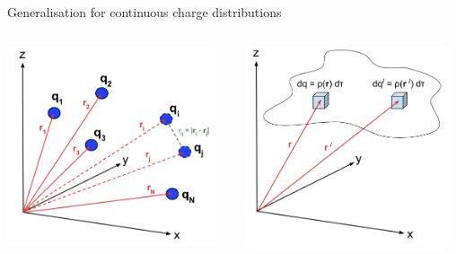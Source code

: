 \begin{frame}{Generalisation for continuous charge distributions}
\begin{columns}
  \begin{column}{0.50\textwidth}
   \begin{center}
     \includegraphics[width=0.95\textwidth]{./images/schematics/work_n_charges.png}\\
   \end{center}
  \end{column}
  \begin{column}{0.50\textwidth}
   \begin{center}
     \includegraphics[width=0.95\textwidth]{./images/schematics/work_continuous_distribution.png}\\
   \end{center}
  \end{column}
\end{columns}

\end{frame}



